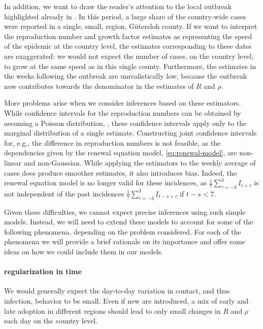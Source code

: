 In addition, we want to draw the reader's attention to the local outbreak highlighted already in . In this period, a large share of the country-wide cases were reported in a single, small, region, Gütersloh county. If we want to interpret the reproduction number and growth factor estimates as representing the speed of the epidemic at the country level, the estimates corresponding to these dates are exaggerated: we would not expect the number of cases, on the country level, to grow at the same speed as in this single county. Furthermore, the estimates in the weeks following the outbreak are unrealistically low, because the outbreak now contributes towards the denominator in the estimates of $R$ and $\rho$. 

More problems arise when we consider inferences based on these estimators. While confidence intervals for the reproduction numbers can be obtained by assuming a Poisson distribution, , these confidence intervals apply only to the marginal distribution of a single estimate. Constructing joint confidence intervals for, e.g., the difference in reproduction numbers is not feasible, as the dependencies given by the renewal equation model, \eqref{eq:renewal-model}, are non-linear and non-Gaussian. While applying the estimators to the weekly average of cases does produce smoother estimates, it also introduces bias. Indeed, the renewal equation model is no longer valid for these incidences, as $\frac{1}{7}\sum_{\tau = -3}^3 I_{t + \tau}$ is not independent of the past incidences $\frac{1}7 \sum_{\tau = -3 }^3 I_{t - s +\tau}$ if $t - s < 7$. 


Given these difficulties, we cannot expect precise inferences using such simple models. Instead, we will need to extend these models to account for some of the following phenomena, depending on the problem considered. For each of the phenomena we will provide a brief rationale on its importance and offer some ideas on how we could include them in our models. 

\paragraph{regularization in time}
We would generally expect the day-to-day variation in contact, and thus infection, behavior to be small. Even if new  are introduced, a mix of early and late adoption in different regions should lead to only small changes in $R$ and $\rho$ each day on the country level. 

